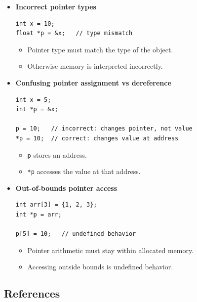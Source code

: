 \documentclass[10pt]{article}
\begin{document}
\begin{itemize}
\item \textbf{Incorrect pointer types}
\begin{verbatim}
int x = 10;
float *p = &x;   // type mismatch
\end{verbatim}

\begin{itemize}
    \item Pointer type must match the type of the object.
    \item Otherwise memory is interpreted incorrectly.
\end{itemize}

\item \textbf{Confusing pointer assignment vs dereference}
\begin{verbatim}
int x = 5;
int *p = &x;

p = 10;   // incorrect: changes pointer, not value
*p = 10;  // correct: changes value at address
\end{verbatim}

\begin{itemize}
    \item \verb|p| stores an address.
    \item \verb|*p| accesses the value at that address.
\end{itemize}

\item \textbf{Out-of-bounds pointer access}
\begin{verbatim}
int arr[3] = {1, 2, 3};
int *p = arr;

p[5] = 10;   // undefined behavior
\end{verbatim}

\begin{itemize}
    \item Pointer arithmetic must stay within allocated memory.
    \item Accessing outside bounds is undefined behavior.
\end{itemize}

\end{itemize}

\newpage

\subsection{References}
\end{document}
